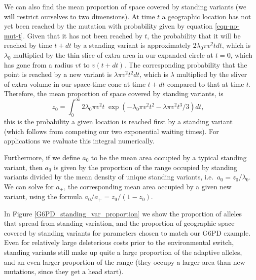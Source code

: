 \documentclass{article}
\newcommand{\plr}[1]{{\it\color{blue}#1}}
\begin{document}
We can also find the mean proportion of space covered by standing
variants (we will restrict ourselves to two dimensions).
At time $t$ a geographic location has not yet been reached by the
mutation with probability given by equation \eqref{eqn-no-mut-t}.
Given that it has not been reached by $t$, the probability that it will be reached by time $t+dt$ 
by a standing variant is approximately $2 \lambda_0 \pi v^2 t dt$,
which is $\lambda_0$ multiplied by the thin slice of extra area in our
expanded circle at $t=0$, which has gone from a radius $vt$ to
$v(t+dt)$. The corresponding probability that the point is reached by a new
variant is 
$\lambda \pi v^2 t^2 dt$, which is $\lambda$ multiplied by the
sliver of  extra volume in our space-time cone at time $t+dt$ compared to that at time $t$.
Therefore, the mean proportion of space covered by standing variants,
is
\begin{equation} \label{prop_space_standing}
    z_0 = \int_0^\infty {2 \lambda_0 \pi v^2 t} \; \exp \left( -
      \lambda_0 \pi v^2 t^2 - \lambda \pi v^2 t^3 / 3 \right) dt,
\end{equation}
this is the probability a given location is reached first by a
standing variant (which follows from competing our two exponential
waiting times).
For applications we evaluate this integral numerically.

Furthermore, if we define $a_0$ to be the mean area occupied by a typical standing variant, 
then $a_0$ is given by the proportion of the range occupied by standing variants divided by the mean density of unique standing variants,
i.e.\ $a_0 = z_0 / \lambda_0$.
We can solve for $a_+$, the corresponding mean area occupied by a given new variant, 
using the formula $a_0 / a_+ = z_0 / (1-z_0)$.

In Figure \ref{G6PD_standing_var_proportion} we show the proportion of
alleles that spread from standing variation, and the proportion of
geographic space covered by standing variants for parameters chosen to match our G6PD example.
Even for relatively large deleterious costs prior to the environmental switch, 
standing variants still make up quite a large proportion of the adaptive alleles, 
and an even larger proportion of the range 
(they occupy a larger area than new mutations, since they get a head start).



\end{document}
